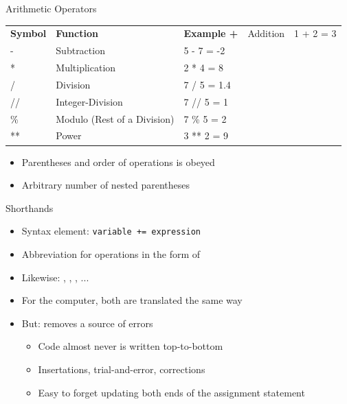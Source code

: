 \begin{frame}{Arithmetic Operators}
%
%
%
\begin{tabularx}
	{\linewidth}
	{OFX}
	\toprule[1.5pt]

	\normalfont	\bfseries Symbol &
				\bfseries Function &
				\bfseries Example
	\tabcrlf
	+  & Addition                    & 1 + 2 = 3 \\
	-  & Subtraction                 & 5 - 7 = -2 \\
	*  & Multiplication              & 2 * 4 = 8 \\
	/  & Division                    & 7 / 5 = 1.4 \\
	// & Integer-Division            & 7 // 5 = 1 \\
	\% & Modulo (Rest of a Division) & 7 \% 5 = 2 \\
	** & Power                       & 3 ** 2 = 9 \\
	
	\bottomrule[1.5pt]	
\end{tabularx}
\begin{itemize}
\item Parentheses and order of operations is obeyed
\item Arbitrary number of nested parentheses
\end{itemize}
%
\end{frame}


\begin{frame}{Shorthands}
%
\begin{itemize}
\item Syntax element: \texttt{variable += expression}
\item Abbreviation for operations in the form of 
\item Likewise: \inPy{-=}, \inPy{*=}, \inPy{/=}, ...
\item For the computer, both are translated the same way
\item But: removes a source of errors
	\begin{itemize}
	\item Code almost never is written top-to-bottom
	\item Insertations, trial-and-error, corrections
	\item Easy to forget updating both ends of the assignment statement
	\end{itemize}
\end{itemize}
%
\end{frame}

